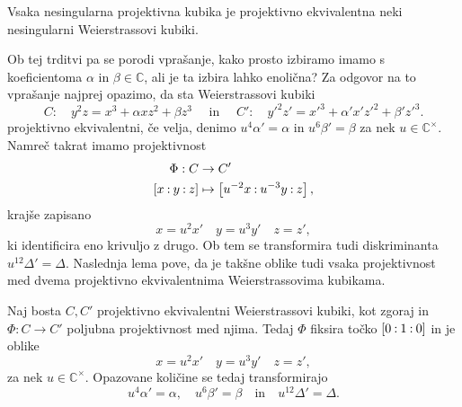 \documentclass[mat1]{fmfdelo}
\numberwithin{equation}{section}
\newcommand{\C}{\mathbb C}
\newcommand{\CM}{\mathbb C ^\times}
\newcommand{\pcoor}[1]{%
\begingroup\lccode`~=`: \lowercase{\endgroup
\edef~}{\mathbin{\mathchar\the\mathcode`:}\nobreak}%
\left[%
\begingroup
\mathcode`:=\string"8000
#1%
\endgroup
\right]%
}
\theoremstyle{definition}
\begin{document}
\begin{trditev}
    \label{kubika izomorfna neki wnf}
    Vsaka nesingularna projektivna kubika je projektivno ekvivalentna neki nesingularni Weierstrassovi kubiki.  
\end{trditev}

\begin{dokaz}
    \cite[lemma 15.2]{Gibson}
\end{dokaz}

Ob tej trditvi pa se porodi vprašanje, kako prosto izbiramo imamo s koeficientoma $\alpha$ in $\beta \in \C$, ali je ta izbira lahko enolična? Za odgovor na to vprašanje najprej opazimo, da sta Weierstrassovi kubiki 
\[
    C: \quad y^2z = x^3 + \alpha xz^2 + \beta z^3 \quad \text{ in } \quad
    C': \quad y'^2z' = x'^3 + \alpha' x'z'^2 + \beta' z'^3. 
\]
projektivno ekvivalentni, če velja, denimo $u^4 \alpha' = \alpha$ in $u^6 \beta' = \beta$ za nek $u \in \CM$. Namreč takrat imamo projektivnost
\begin{align*}
    \Phi:C &\to C'\\
    \pcoor{x : y : z} &\mapsto \pcoor{u^{-2}x : u^{-3}y : z},
\end{align*}
krajše zapisano 
\[
    x = u^2 x' \quad y = u^3 y' \quad z = z',  
\]
ki identificira eno krivuljo z drugo. Ob tem se transformira tudi diskriminanta $u^{12} \Delta' = \Delta$. Naslednja lema pove, da je takšne oblike tudi vsaka projektivnost med dvema projektivno ekvivalentnima Weierstrassovima kubikama. 
        
\begin{lema}
    \label{projektivnosti wnf}
    Naj bosta $C, C'$ projektivno ekvivalentni Weierstrassovi kubiki, kot zgoraj in $\Phi: C \to C'$ poljubna projektivnost med njima. Tedaj $\Phi$ fiksira točko $\pcoor{0 : 1 : 0}$ in je oblike
    \begin{equation}
        \label{eq:transformacija wnf}
        x = u^2 x' \quad y = u^3 y' \quad z = z',  
    \end{equation}
    za nek $u \in \CM$. Opazovane količine se tedaj transformirajo 
    \begin{equation}
        \label{eq:transformacija koeficientov in diskriminante}
        u^4 \alpha' = \alpha, \quad u^6 \beta' = \beta \quad \text{in} \quad u^{12} \Delta' = \Delta.
    \end{equation}
\end{lema}
\end{document}
